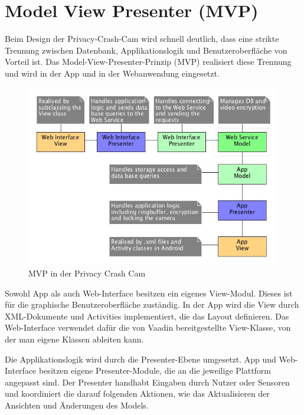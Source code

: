 \section{Model View Presenter (MVP)} \label{allg:MVP}

Beim Design der Privacy-Crash-Cam wird schnell deutlich, dass eine strikte Trennung zwischen Datenbank, Applikationslogik und Benutzeroberfläche von Vorteil ist. Das Model-View-Presenter-Prinzip (MVP) realisiert diese Trennung und wird in der App und in der Webanwendung eingesetzt.\newline\par

\begin{figure}[ht]
	\centering
\includegraphics[width=1\textwidth]{./resources/Diagramme/overview_mvp.jpg}
\caption{MVP in der Privacy Crash Cam}
	\label{fig:overview_mvp}
\end{figure}

Sowohl App als auch Web-Interface besitzen ein eigenes View-Modul. Dieses ist für die graphische Benutzeroberfläche zuständig. In der App wird die View durch XML-Dokumente und Activities implementiert, die das Layout definieren. Das Web-Interface verwendet dafür die von Vaadin bereitgestellte View-Klasse, von der man eigene Klassen ableiten kann.\newline\par

Die Applikationslogik wird durch die Presenter-Ebene umgesetzt. App und Web-Interface besitzen eigene Presenter-Module, die an die jeweilige Plattform angepasst sind. Der Presenter handhabt Eingaben durch Nutzer oder Sensoren und koordiniert die darauf folgenden Aktionen, wie das Aktualisieren der Ansichten und Änderungen des Models.\newline\par

